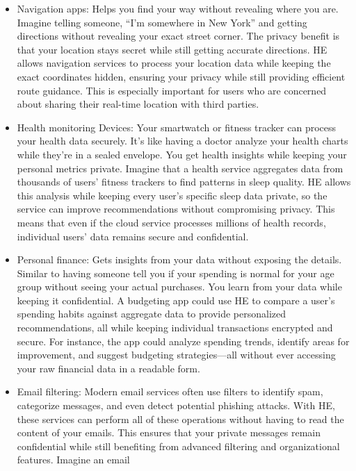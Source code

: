 \documentclass[
  letterpaper,
  DIV=11,
  numbers=noendperiod,
  oneside]{scrartcl}
\begin{document}
\begin{itemize}
\item
  Navigation apps: Helps you find your way without revealing where you
  are. Imagine telling someone, ``I'm somewhere in New York'' and
  getting directions without revealing your exact street corner. The
  privacy benefit is that your location stays secret while still getting
  accurate directions. HE allows navigation services to process your
  location data while keeping the exact coordinates hidden, ensuring
  your privacy while still providing efficient route guidance. This is
  especially important for users who are concerned about sharing their
  real-time location with third parties.
\item
  Health monitoring Devices: Your smartwatch or fitness tracker can
  process your health data securely. It's like having a doctor analyze
  your health charts while they're in a sealed envelope. You get health
  insights while keeping your personal metrics private. Imagine that a
  health service aggregates data from thousands of users' fitness
  trackers to find patterns in sleep quality. HE allows this analysis
  while keeping every user's specific sleep data private, so the service
  can improve recommendations without compromising privacy. This means
  that even if the cloud service processes millions of health records,
  individual users' data remains secure and confidential.
\item
  Personal finance: Gets insights from your data without exposing the
  details. Similar to having someone tell you if your spending is normal
  for your age group without seeing your actual purchases. You learn
  from your data while keeping it confidential. A budgeting app could
  use HE to compare a user's spending habits against aggregate data to
  provide personalized recommendations, all while keeping individual
  transactions encrypted and secure. For instance, the app could analyze
  spending trends, identify areas for improvement, and suggest budgeting
  strategies---all without ever accessing your raw financial data in a
  readable form.
\item
  Email filtering: Modern email services often use filters to identify
  spam, categorize messages, and even detect potential phishing attacks.
  With HE, these services can perform all of these operations without
  having to read the content of your emails. This ensures that your
  private messages remain confidential while still benefiting from
  advanced filtering and organizational features. Imagine an email

\end{itemize}
\end{document}
